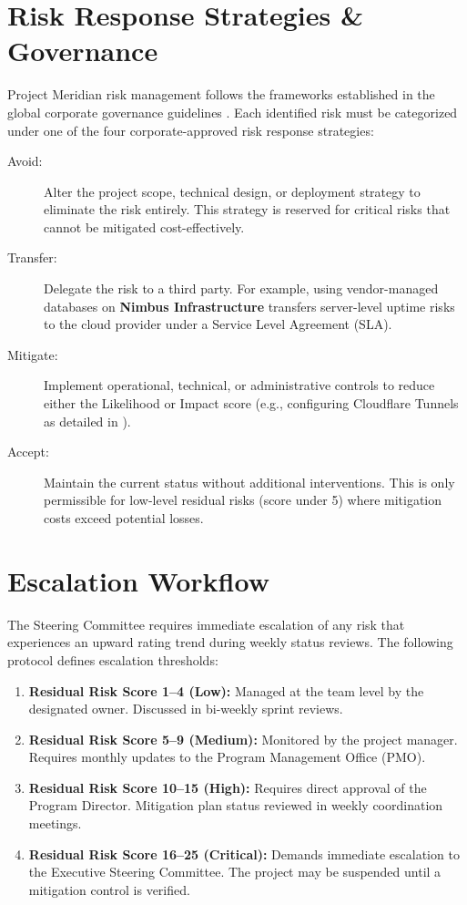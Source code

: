 \section{Risk Response Strategies \& Governance}
Project Meridian risk management follows the frameworks established in the global corporate governance guidelines \cite{iso31000, nexa2024risk}. Each identified risk must be categorized under one of the four corporate-approved risk response strategies:

\begin{description}
  \item[Avoid:] Alter the project scope, technical design, or deployment strategy to eliminate the risk entirely. This strategy is reserved for critical risks that cannot be mitigated cost-effectively.
  \item[Transfer:] Delegate the risk to a third party. For example, using vendor-managed databases on \textbf{Nimbus Infrastructure} transfers server-level uptime risks to the cloud provider under a Service Level Agreement (SLA).
  \item[Mitigate:] Implement operational, technical, or administrative controls to reduce either the Likelihood or Impact score (e.g., configuring Cloudflare Tunnels as detailed in \cite{jenkins2023enterprise}).
  \item[Accept:] Maintain the current status without additional interventions. This is only permissible for low-level residual risks (score under 5) where mitigation costs exceed potential losses.
\end{description}

\section{Escalation Workflow}
The Steering Committee requires immediate escalation of any risk that experiences an upward rating trend during weekly status reviews. The following protocol defines escalation thresholds:
\begin{enumerate}
  \item \textbf{Residual Risk Score 1--4 (Low):} Managed at the team level by the designated owner. Discussed in bi-weekly sprint reviews.
  \item \textbf{Residual Risk Score 5--9 (Medium):} Monitored by the project manager. Requires monthly updates to the Program Management Office (PMO).
  \item \textbf{Residual Risk Score 10--15 (High):} Requires direct approval of the Program Director. Mitigation plan status reviewed in weekly coordination meetings.
  \item \textbf{Residual Risk Score 16--25 (Critical):} Demands immediate escalation to the Executive Steering Committee. The project may be suspended until a mitigation control is verified.
\end{enumerate}
